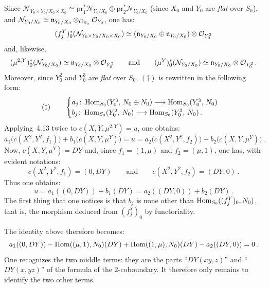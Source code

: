 Since \(\mathcal{N}_{Y_{0}\times Y_{0}/X_{0}\times X_{0}}
\simeq\mathrm{pr}_{1}^{*}\mathcal{N}_{Y_{0}/X_{0}}
\oplus\mathrm{pr}_{2}^{*}\mathcal{N}_{Y_{0}/X_{0}}\)
(since \(X_{0}\) and \(Y_{0}\) are \emph{flat} over \(S_{0}\)), and
\(\mathcal{N}_{Y_{0}/X_{0}}\simeq\mathfrak{n}_{Y_{0}/X_{0}}\otimes_{\mathcal{O}_{S_{0}}}\mathcal{O}_{Y_{0}}\),
one has:
\[
(f_{j}^{Y})_{0}^{*}(\mathcal{N}_{Y_{0}\times Y_{0}/X_{0}\times X_{0}})
\simeq
(\mathfrak{n}_{Y_{0}/X_{0}}\oplus\mathfrak{n}_{Y_{0}/X_{0}})\otimes\mathcal{O}_{Y_{0}^{3}}
\]
and, likewise,
\[
(\mu^{2,Y})_{0}^{*}(\mathcal{N}_{Y_{0}/X_{0}})
\simeq
\mathfrak{n}_{Y_{0}/X_{0}}\otimes\mathcal{O}_{Y_{0}^{3}}
\qquad\text{and}\qquad
(\mu^{Y})_{0}^{*}(\mathcal{N}_{Y_{0}/X_{0}})
\simeq
\mathfrak{n}_{Y_{0}/X_{0}}\otimes\mathcal{O}_{Y_{0}^{2}}\,.
\]
Moreover, since \(Y_{0}^{2}\) and \(Y_{0}^{3}\) are \emph{flat} over \(S_{0}\),
\((\dagger)\) is rewritten in the following form:
\[
(\ddagger)\qquad
\begin{cases}
a_{j}\colon\operatorname{Hom}_{S_{0}}(Y_{0}^{3},\,N_{0}\oplus N_{0})
  \longrightarrow\operatorname{Hom}_{S_{0}}(Y_{0}^{3},\,N_{0})
\\
b_{j}\colon\operatorname{Hom}_{S_{0}}(Y_{0}^{2},\,N_{0})
  \longrightarrow\operatorname{Hom}_{S_{0}}(Y_{0}^{3},\,N_{0})\,.
\end{cases}
\]
Applying~4.13 twice to \(c(X,Y,\mu^{2,Y})=u\), one obtains:
\[
a_{1}\bigl(c(X^{2},Y^{2},f_{1})\bigr)+b_{1}\bigl(c(X,Y,\mu^{Y})\bigr)
=
u
=
a_{2}\bigl(c(X^{2},Y^{2},f_{2})\bigr)+b_{2}\bigl(c(X,Y,\mu^{Y})\bigr)\,.
\]
Now, \(c(X,Y,\mu^{Y})=DY\) and, since \(f_{1}=(1,\mu)\) and \(f_{2}=(\mu,1)\),
one has, with evident notations:
\[
c(X^{2},Y^{2},f_{1})=(0,DY)
\qquad\text{and}\qquad
c(X^{2},Y^{2},f_{2})=(DY,0)\,.
\]
Thus one obtains:
\[
u=a_{1}((0,DY))+b_{1}(DY)=a_{2}((DY,0))+b_{2}(DY)\,.
\]
The first thing that one notices is that \(b_{j}\) is none other than
\(\operatorname{Hom}_{S_{0}}((f_{j}^{Y})_{0},N_{0})\), that is, the morphism deduced from
\((f_{j}^{Y})_{0}\) by functoriality.

The identity above therefore becomes:
\[
a_{1}((0,DY))-\operatorname{Hom}((\mu,1),N_{0})(DY)
+\operatorname{Hom}((1,\mu),N_{0})(DY)
-a_{2}((DY,0))=0\,.
\]
One recognizes the two middle terms: they are the parts ``\(DY(xy,z)\)'' and
``\(DY(x,yz)\)'' of the formula of the \(2\)-coboundary. It therefore only
remains to identify the two other terms.

